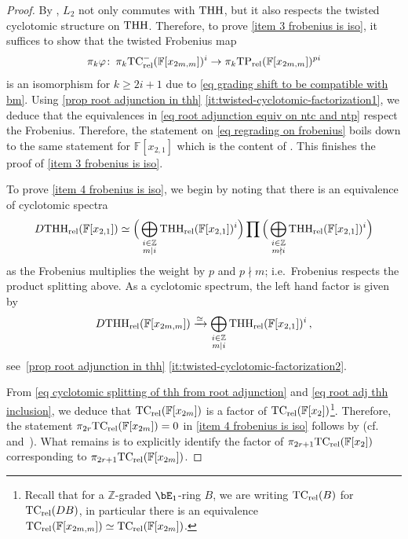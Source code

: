 \documentclass[english,10pt]{amsart}
\newcommand{\rel}{\textup{rel}}
\newcommand{\field}{\mathbb{F}}
\theoremstyle{definition}
\numberwithin{equation}{section}
\DeclareMathOperator{\thh}{\ensuremath{\textup{THH}}}
\newcommand{\rntc}{\mathrm{TC}_{\rel}^{-}}
\newcommand{\rtp}{\mathrm{TP}_{\rel}}
\newcommand{\rtc}{\mathrm{TC}_{\rel}}
\newcommand{\rthh}{\mathrm{THH}_{\rel}}
\newcommand{\z}{\mathbb{Z}}
\def\co{\colon\thinspace}
\begin{document}
\begin{proof}
By \cite[Lemma A.14]{antieau2020beilinson}, $L_2$ not only commutes with $\thh$, but it also respects the twisted cyclotomic structure on $\thh$. Therefore, to prove \eqref{item 3 frobenius is iso}, it suffices to show that the twisted Frobenius map 
\begin{equation}\label{eq regrading on frobenius}
\pi_k \varphi\co \pi_k\rntc(\field[x_{2m,m}])^{i} \to \pi_k\rtp(\field[x_{2m,m}])^{pi}
\end{equation}
is an isomorphism for $k\geq 2i+1$ due to \eqref{eq grading shift to be compatible with bm}. Using \autoref{prop root adjunction in thh} \eqref{it:twisted-cyclotomic-factorization1}, we deduce that the equivalences in \eqref{eq root adjunction equiv on ntc and ntp} respect the Frobenius. Therefore, the statement on \eqref{eq regrading on frobenius} boils down to the same statement for $\field[x_{2,1}]$ which is the content of  \cite[Corollary 5.16]{bayindir2020kthryofthh}. This finishes the proof of \eqref{item 3 frobenius is iso}.

    To prove \eqref{item 4 frobenius is iso}, we begin by noting that there is an equivalence of cyclotomic spectra
     \begin{equation}\label{eq cyclotomic splitting of thh from root adjunction}
        D\rthh(\field[x_{2,1}]) \simeq \Big( \bigoplus_{\substack{i\in \z \\ m \mid i }} \rthh(\field[x_{2,1}])^{i} \Big) \prod  \Big(\bigoplus_{\substack{ i\in \z \\m \nmid i }} \rthh(\field[x_{2,1}])^{i} \Big) 
        \end{equation}
      as the Frobenius multiplies the weight by $p$ and $p \nmid m$; i.e.\ Frobenius respects the product splitting above. As a cyclotomic spectrum, the left hand factor is given by
      \begin{equation}\label{eq root adj thh inclusion}
      D \rthh(\field[x_{2m,m}]) \xrightarrow{\simeq} \bigoplus_{ \substack{i \in \z \\ m \mid i}} \rthh(\field[x_{2,1}])^i \,,
      \end{equation}
see~\autoref{prop root adjunction in thh} \eqref{it:twisted-cyclotomic-factorization2}. 
      
      
      
      From \eqref{eq cyclotomic splitting of thh from root adjunction} and \eqref{eq root adj thh inclusion}, we deduce that  $\rtc(\field[x_{2m}])$ is a factor of $\rtc(\field[x_{2}])$\footnote{Recall that for a $\z$-graded $\bE_1$-ring $B$, we are writing $\rtc(B)$ for $\rtc(DB)$, in particular there is an equivalence $\rtc(\field[x_{2m,m}]) \simeq \rtc(\field[x_{2m}])$.}. Therefore, the statement $\pi_{2r} \rtc(\field[x_{2m}]) = 0$ in \eqref{item 4 frobenius is iso} follows by  \cite[Theorem 1.2]{bayindir2020kthryofthh} (cf.~\cite[Example~4.29]{land2023kthrypushouts} and~\cite{Hes07}). What remains is to explicitly identify the factor of $\pi_{2r+1}\rtc(\field[x_{2}])$ corresponding to $\pi_{2r+1}\rtc(\field[x_{2m}])$.
      

\end{proof}
\end{document}
